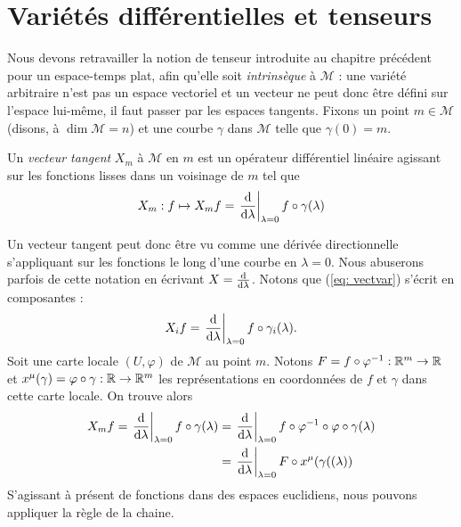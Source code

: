 \section{Variétés différentielles et tenseurs}
Nous devons retravailler la notion de tenseur introduite au chapitre précédent pour un espace-temps plat, afin qu'elle soit \emph{intrinsèque} à $\mathcal{M}$ : une variété arbitraire n'est pas un espace vectoriel et un vecteur ne peut donc être défini sur l'espace lui-même, il faut passer par les espaces tangents. Fixons un point $m\in \mathcal{M}$ (disons, à $\dim \mathcal{M} = n$) et une courbe $\gamma$ dans $\mathcal{M}$ telle que $\gamma(0)=m$.
\begin{theoremframe}
    \begin{defi}
        Un \emph{vecteur tangent} $X_m$ à $\mathcal{M}$ en $m$ est un opérateur différentiel linéaire agissant sur les fonctions lisses dans un voisinage de $m$ tel que
        \begin{equation}
        \label{eq: vectvar}
            X_m : f \mapsto X_m f =\left. \frac{\mathrm{d}}{\mathrm{d} \lambda}\right|_{\lambda=0}  f \circ \gamma(\lambda)
        \end{equation}
    \end{defi}
\end{theoremframe}
Un vecteur tangent peut donc être vu comme une dérivée directionnelle s'appliquant sur les fonctions le long d'une courbe en $\lambda=0$. Nous abuserons parfois de cette notation en écrivant $X = \frac{\mathrm{d}}{\mathrm{d} \lambda}$. Notons que (\ref{eq: vectvar}) s'écrit en composantes :
\begin{equation}
    X_i f = \left. \frac{\mathrm{d}}{\mathrm{d} \lambda}\right|_{\lambda=0}  f \circ \gamma_i(\lambda).
\end{equation}
Soit une carte locale $(U,\varphi)$ de $\mathcal{M}$ au point $m$. Notons $F = f \circ \varphi^{-1} : \mathbb{R}^m\to \mathbb{R}$ et $x^\mu(\gamma) = \varphi \circ \gamma: \mathbb{R} \to \mathbb{R}^m$ les représentations en coordonnées de $f$ et $\gamma$ dans cette carte locale. On trouve alors
\begin{align}
    X_m f = \left. \frac{\mathrm{d}}{\mathrm{d} \lambda}\right|_{\lambda=0}  f \circ \gamma(\lambda) &= \left. \frac{\mathrm{d}}{\mathrm{d} \lambda}\right|_{\lambda=0}  f \circ \varphi^{-1} \circ \varphi \circ \gamma(\lambda)\\
    & = \left. \frac{\mathrm{d}}{\mathrm{d} \lambda}\right|_{\lambda=0}  F \circ x^\mu(\gamma((\lambda))
\end{align}
S'agissant à présent de fonctions dans des espaces euclidiens, nous pouvons appliquer la règle de la chaine.
